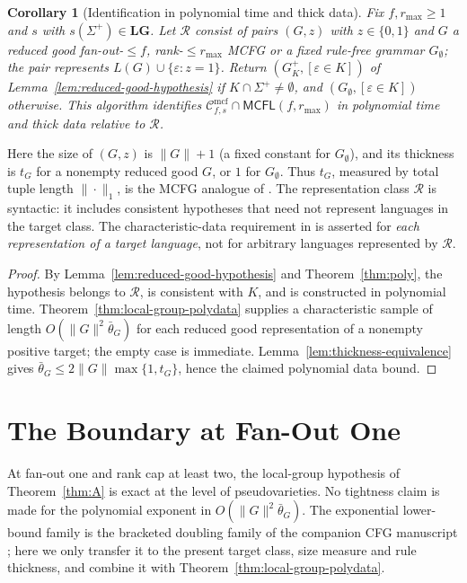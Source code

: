\documentclass[11pt]{article}
\numberwithin{equation}{section}
\theoremstyle{plain}
\newtheorem{corollary}[theorem]{Corollary}
\theoremstyle{definition}
\theoremstyle{remark}
\newcommand{\Cmcf}[2]{\mathcal{C}^{\mathrm{mcf}}_{#1,#2}}
\newcommand{\eps}{\varepsilon}
\theoremstyle{plain}
\begin{document}
\begin{corollary}[Identification in polynomial time and thick data]
\label{cor:iptd}
Fix $f,r_{\max}\ge1$ and $s$ with $s(\Sigma^+)\in\mathbf{LG}$.
Let $\mathcal R$ consist of pairs $(G,z)$ with $z\in\{0,1\}$
and $G$ a reduced good fan-out-$\le f$, rank-$\le r_{\max}$
MCFG or a fixed rule-free grammar $G_\emptyset$; the pair
represents $L(G)\cup\{\eps:z=1\}$.
Return $(G^+_K,[\eps\in K])$ of
Lemma~\ref{lem:reduced-good-hypothesis} if
$K\cap\Sigma^+\ne\emptyset$, and
$(G_\emptyset,[\eps\in K])$ otherwise.
This algorithm identifies
$\Cmcf{f}{s}\cap\mathsf{MCFL}(f,r_{\max})$
in polynomial time and thick data relative to $\mathcal R$.
\end{corollary}
Here the size of $(G,z)$ is $\|G\|+1$ (a fixed constant for
$G_\emptyset$), and its thickness is $t_G$ for a nonempty reduced
good $G$, or $1$ for $G_\emptyset$.  Thus $t_G$, measured by
total tuple length $\|\cdot\|_1$, is the MCFG analogue of
\cite[Definition~2.11]{EyraudHeinzYoshinaka2016}.
The representation class $\mathcal R$ is syntactic: it includes
consistent hypotheses that need not represent languages in the
target class.  The characteristic-data requirement in
\cite[Definition~2.12]{EyraudHeinzYoshinaka2016} is asserted
for \emph{each representation of a target language}, not for
arbitrary languages represented by $\mathcal R$.

\begin{proof}
By Lemma~\ref{lem:reduced-good-hypothesis} and
Theorem~\ref{thm:poly}, the hypothesis belongs to $\mathcal R$,
is consistent with $K$, and is constructed in polynomial time.
Theorem~\ref{thm:local-group-polydata} supplies a characteristic
sample of length $O(\|G\|^2\bar\theta_G)$ for each reduced good
representation of a nonempty positive target; the empty case is
immediate.  Lemma~\ref{lem:thickness-equivalence} gives
$\bar\theta_G\le2\|G\|\max\{1,t_G\}$, hence the claimed
polynomial data bound.
\end{proof}

\section{The Boundary at Fan-Out One}
\label{sec:fanout-one}

At fan-out one and rank cap at least two, the local-group
hypothesis of Theorem~\ref{thm:A} is exact at the level of
pseudovarieties.  No tightness claim is made for the polynomial
exponent in $O(\|G\|^2\bar\theta_G)$.  The exponential lower-bound family is the bracketed
doubling family of the companion CFG manuscript
\cite[Proposition~6.4]{kuriyamaCFG}; here we only transfer it to the
present target class, size measure and rule thickness, and combine it
with Theorem~\ref{thm:local-group-polydata}.
\end{document}
